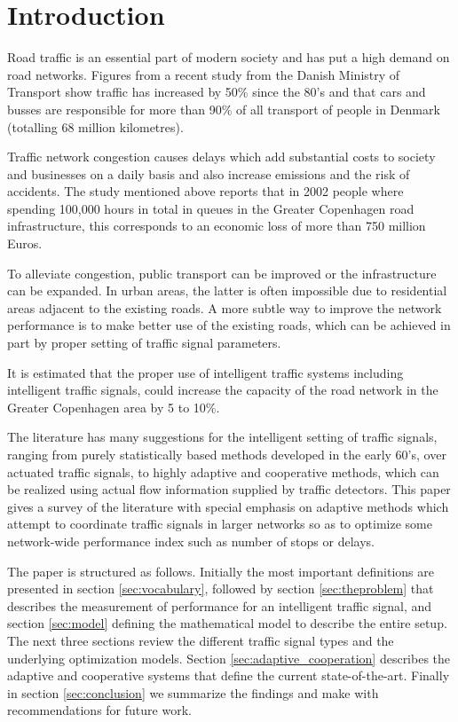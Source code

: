 \section{Introduction}

Road traffic is an essential part of modern society and has put a high
demand on road networks. Figures from a recent study from the Danish
Ministry of Transport \cite{47} show traffic has increased by 50\%
since the 80's and that cars and busses are responsible for more than
90\% of all transport of people in Denmark (totalling 68 million
kilometres).

Traffic network congestion causes delays which add substantial costs
to society and businesses on a daily basis and also increase emissions
and the risk of accidents. The study mentioned above reports that in
2002 people where spending 100,000 hours in total in queues in the
Greater Copenhagen road infrastructure, this corresponds to an
economic loss of more than 750 million Euros.

To alleviate congestion, public transport can be improved or the
infrastructure can be expanded. In urban areas, the latter is often
impossible due to residential areas adjacent to the existing roads.  A
more subtle way to improve the network performance is to make better
use of the existing roads, which can be achieved in part by proper
setting of traffic signal parameters.

It is estimated that the proper use of intelligent traffic systems
including intelligent traffic signals, could increase the capacity of the
road network in the Greater Copenhagen area by 5 to 10\%.

The literature has many suggestions for the intelligent setting of
traffic signals, ranging from purely statistically based methods
developed in the early 60's, over actuated traffic signals, to highly
adaptive and cooperative methods, which can be realized using actual
flow information supplied by traffic detectors. This paper gives a
survey of the literature with special emphasis on adaptive methods
which attempt to coordinate traffic signals in larger networks so as
to optimize some network-wide performance index such as number of
stops or delays.

The paper is structured as follows. Initially the most important
definitions are presented in section \ref{sec:vocabulary}, followed by
section \ref{sec:theproblem} that describes the measurement of
performance for an intelligent traffic signal, and section
\ref{sec:model} defining the mathematical model to describe the entire
setup. The next three sections review the different traffic signal
types and the underlying optimization models. Section
\ref{sec:adaptive_cooperation} describes the adaptive and cooperative
systems that define the current state-of-the-art. Finally in section
\ref{sec:conclusion} we summarize the findings and make with
recommendations for future work.
